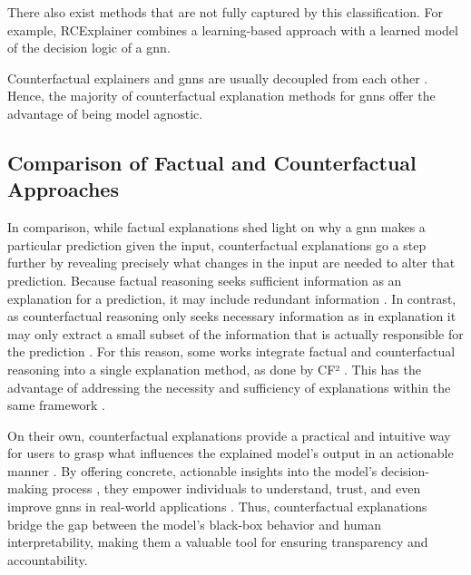 There also exist methods that are not fully captured by this classification. For example, RCExplainer \cite{bajaj_robust_2021} combines a learning-based approach with a learned model of the decision logic of a \gls{gnn}.

Counterfactual explainers and \glspl{gnn} are usually decoupled from each other \cite{prado-romero_survey_2023}. Hence, the majority of counterfactual explanation methods for \glspl{gnn} offer the advantage of being model agnostic.


\subsection{Comparison of Factual and Counterfactual Approaches}
\label{s_ExplainingGNNs_Comparison}

In comparison, while factual explanations shed light on why a \gls{gnn} makes a particular prediction given the input, counterfactual explanations go a step further by revealing precisely what changes in the input are needed to alter that prediction. Because factual reasoning seeks sufficient information as an explanation for a prediction, it may include redundant information \cite{tan_learning_2022}. In contrast, as counterfactual reasoning only seeks necessary information as in explanation it may only extract a small subset of the information that is actually responsible for the prediction \cite{tan_learning_2022}. For this reason, some works integrate factual and counterfactual reasoning into a single explanation method, as done by CF² \cite{tan_learning_2022}. This has the advantage of addressing the necessity and sufficiency of explanations within the same framework \cite{tan_learning_2022}.

On their own, counterfactual explanations provide a practical and intuitive way for users to grasp what influences the explained model's output in an actionable manner \cite{lucic_cf-gnnexplainer_2022}. By offering concrete, actionable insights into the model's decision-making process \cite{lucic_cf-gnnexplainer_2022}, they empower individuals to understand, trust, and even improve \glspl{gnn} in real-world applications \cite{prado-romero_survey_2023}. Thus, counterfactual explanations bridge the gap between the model's black-box behavior and human interpretability, making them a valuable tool for ensuring transparency and accountability.
